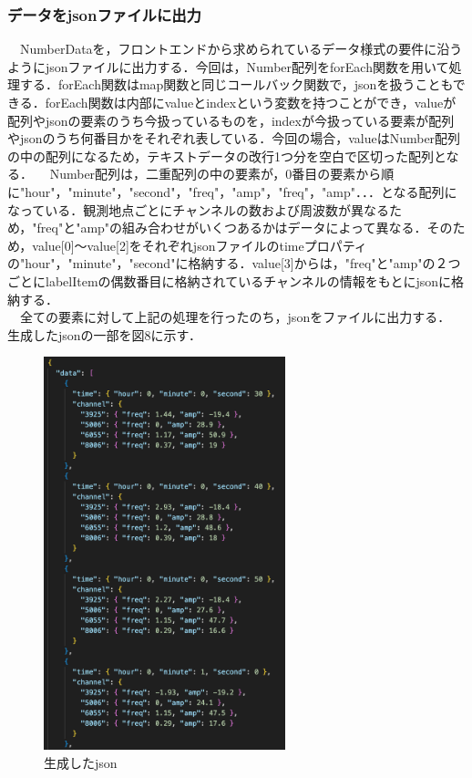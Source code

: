  \subsubsection{データをjsonファイルに出力}
　NumberDataを，フロントエンドから求められているデータ様式の要件に沿うようにjsonファイルに出力する．今回は，Number配列をforEach関数を用いて処理する．forEach関数はmap関数と同じコールバック関数で，jsonを扱うこともできる．forEach関数は内部にvalueとindexという変数を持つことができ，valueが配列やjsonの要素のうち今扱っているものを，indexが今扱っている要素が配列やjsonのうち何番目かをそれぞれ表している．今回の場合，valueはNumber配列の中の配列になるため，テキストデータの改行1つ分を空白で区切った配列となる．
　Number配列は，二重配列の中の要素が，0番目の要素から順に"hour"，"minute"，"second"，"freq"，"amp"，"freq"，"amp"．．．となる配列になっている．観測地点ごとにチャンネルの数および周波数が異なるため，"freq"と"amp"の組み合わせがいくつあるかはデータによって異なる．そのため，value[0]〜value[2]をそれぞれjsonファイルのtimeプロパティの"hour"，"minute"，"second"に格納する．value[3]からは，"freq"と"amp"の２つごとにlabelItemの偶数番目に格納されているチャンネルの情報をもとにjsonに格納する．\\
　全ての要素に対して上記の処理を行ったのち，jsonをファイルに出力する．\\
生成したjsonの一部を図8に示す．\\
\begin{figure}[h]
  \centering
  \includegraphics[width=70mm]{fig/jsonData.png}
  \caption{生成したjson}
\end{figure}

